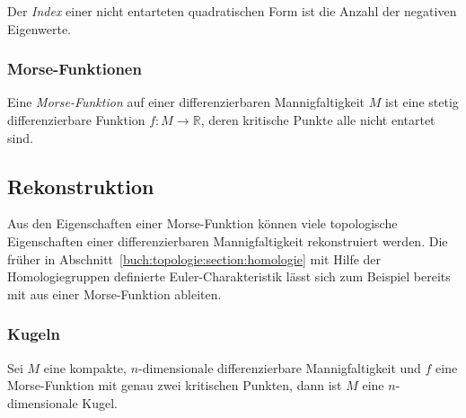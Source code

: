 \begin{definition}[Index]
%
Der \emph{Index} einer nicht entarteten quadratischen Form ist die
Anzahl der negativen Eigenwerte.
\end{definition}

\subsubsection{Morse-Funktionen}

\begin{definition}
%
Eine {\em Morse-Funktion} auf einer differenzierbaren Mannigfaltigkeit
$M$ ist eine stetig differenzierbare Funktion $f\colon M\to\mathbb{R}$,
deren kritische Punkte alle nicht entartet sind.
\end{definition}

%
%
\subsection{Rekonstruktion}
Aus den Eigenschaften einer Morse-Funktion können viele topologische
Eigenschaften einer differenzierbaren Mannigfaltigkeit rekonstruiert
werden.
Die früher in Abschnitt~\ref{buch:topologie:section:homologie}
mit Hilfe der Homologiegruppen definierte Euler-Charakteristik
lässt sich zum Beispiel bereits mit aus einer Morse-Funktion
ableiten.

%
%
\subsubsection{Kugeln}

\begin{satz}
Sei $M$ eine kompakte, $n$-dimensionale differenzierbare Mannigfaltigkeit
und $f$ eine Morse-Funktion mit genau zwei kritischen Punkten, dann ist
$M$ eine $n$-dimensionale Kugel.
\end{satz}

